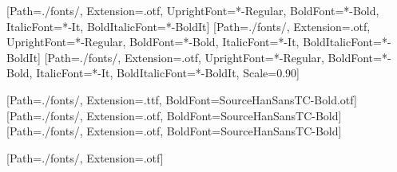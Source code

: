 
\geometry{paperwidth=210mm,paperheight=297mm,hmargin=12mm,vmargin=20mm,headsep=12pt,footskip=14pt}

\usepackage[numbers]{natbib}
\usepackage{fontspec}
\usepackage{xeCJK}

\setmainfont{SourceSerif4}[Path=./fonts/, Extension=.otf,
  UprightFont=*-Regular, BoldFont=*-Bold, ItalicFont=*-It, BoldItalicFont=*-BoldIt]
\setsansfont{SourceSans3}[Path=./fonts/, Extension=.otf,
  UprightFont=*-Regular, BoldFont=*-Bold, ItalicFont=*-It, BoldItalicFont=*-BoldIt]
\setmonofont{SourceCodePro}[Path=./fonts/, Extension=.otf,
  UprightFont=*-Regular, BoldFont=*-Bold, ItalicFont=*-It, BoldItalicFont=*-BoldIt, Scale=0.90]

[Path=./fonts/, Extension=.ttf,
  BoldFont=SourceHanSansTC-Bold.otf]
[Path=./fonts/, Extension=.otf, BoldFont=SourceHanSansTC-Bold]
[Path=./fonts/, Extension=.otf, BoldFont=SourceHanSansTC-Bold]

[Path=./fonts/, Extension=.otf]

